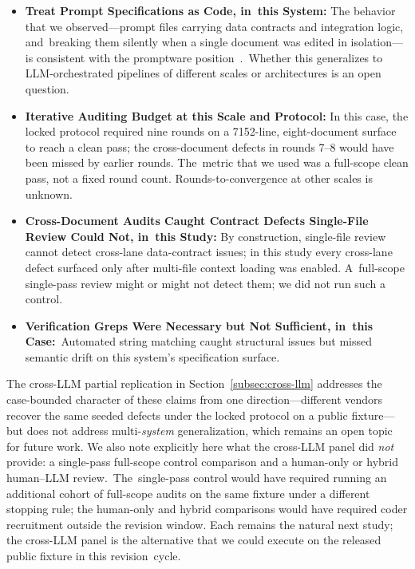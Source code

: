 \documentclass[software,article,accept,pdftex,oneauthor]{Definitions/mdpi}
\begin{document}
\begin{itemize}
\item \textbf{Treat Prompt Specifications as Code, in~this System:} The behavior that we observed---prompt files carrying data contracts and integration logic, and~breaking them silently when a single document was edited in isolation---is consistent with the promptware position~\cite{chen2025promptware}.~Whether this generalizes to LLM-orchestrated pipelines of different scales or architectures is an open question.
\item \textbf{Iterative Auditing Budget at this Scale and Protocol:} In this case, the locked protocol required nine rounds on a 7152-line, eight-document surface to reach a clean pass; the cross-document defects in rounds 7--8 would have been missed by earlier rounds. The~metric that we used was a full-scope clean pass, not a fixed round count. Rounds-to-convergence at other scales is unknown.
\item \textbf{Cross-Document Audits Caught Contract Defects Single-File Review Could Not, in~this Study:} By construction, single-file review cannot detect cross-lane data-contract issues; in this study every cross-lane defect surfaced only after multi-file context loading was enabled. A~full-scope single-pass review might or might not detect them; we did not run such a control.
\item \textbf{Verification Greps Were Necessary but Not Sufficient, in~this Case:}~Automated string matching caught structural issues but missed semantic drift on this system's specification surface.
\end{itemize}

The cross-LLM partial replication in Section~\ref{subsec:cross-llm} addresses the case-bounded character of these claims from one direction---different vendors recover the same seeded defects under the locked protocol on a public fixture---but does not address multi-\emph{system} generalization, which remains an open topic for future work. We also note explicitly here what the cross-LLM panel did \emph{not} provide: a single-pass full-scope control comparison and a human-only or hybrid human--LLM review.~The~single-pass control would have required running an additional cohort of full-scope audits on the same fixture under a different stopping rule; the human-only and hybrid comparisons would have required coder recruitment outside the revision window. Each remains the natural next study; the cross-LLM panel is the alternative that we could execute on the released public fixture in this revision~cycle.
\end{document}
